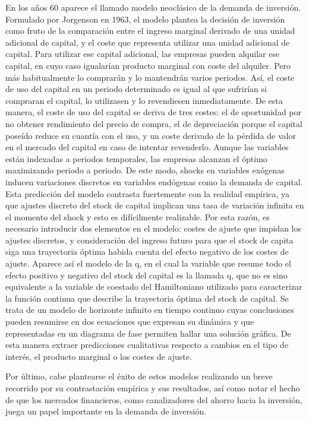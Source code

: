 \documentclass{nuevotema}
\begin{document}
En los años 60 aparece el llamado modelo neoclásico de la demanda de inversión. Formulado por Jorgenson en 1963, el modelo plantea la decisión de inversión como fruto de la comparación entre el ingreso marginal derivado de una unidad adicional de capital, y el coste que representa utilizar una unidad adicional de capital. Para utilizar ese capital adicional, las empresas pueden alquilar ese capital, en cuyo caso igualarían producto marginal con coste del alquiler. Pero más habitualmente lo comprarán y lo mantendrán varios periodos. Así, el coste de uso del capital en un periodo determinado es igual al que sufrirían si compraran el capital, lo utilizasen y lo revendiesen inmediatamente. De esta manera, el coste de uso del capital se deriva de tres costes: el de oportunidad por no obtener rendimiento del precio de compra, el de depreciación porque el capital poseído reduce su cuantía con el uso, y un coste derivado de la pérdida de valor en el mercado del capital en caso de intentar revenderlo. Aunque las variables están indexadas a periodos temporales, las empresas alcanzan el óptimo maximizando periodo a periodo. De este modo, shocks en variables exógenas inducen variaciones discretos en variables endógenas como la demanda de capital. Esta predicción del modelo contrasta fuertemente con la realidad empírica, ya que ajustes discreto del stock de capital implican una tasa de variación infinita en el momento del shock y esto es difícilmente realizable. Por esta razón, es necesario introducir dos elementos en el modelo: costes de ajuste que impidan los ajustes discretos, y consideración del ingreso futuro para que el stock de capita siga una trayectoria óptima habida cuenta del efecto negativo de los costes de ajuste. Aparece así el modelo de la q, en el cual la variable que resume todo el efecto positivo y negativo del stock del capital es la llamada q, que no es sino equivalente a la variable de coestado del Hamiltoniano utilizado para caracterizar la función continua que describe la trayectoria óptima del stock de capital. Se trata de un modelo de horizonte infinito en tiempo continuo cuyas conclusiones pueden resumirse en dos ecuaciones que expresan su dinámica y que representadas en un diagrama de fase permiten hallar una solución gráfica. De esta manera extraer predicciones cualitativas respecto a cambios en el tipo de interés, el producto marginal o los costes de ajuste.

Por último, cabe plantearse el éxito de estos modelos realizando un breve recorrido por su contrastación empírica y sus resultados, así como notar el hecho de que los mercados financieros, como canalizadores del ahorro hacia la inversión, juega un papel importante en la demanda de inversión.
\end{document}
